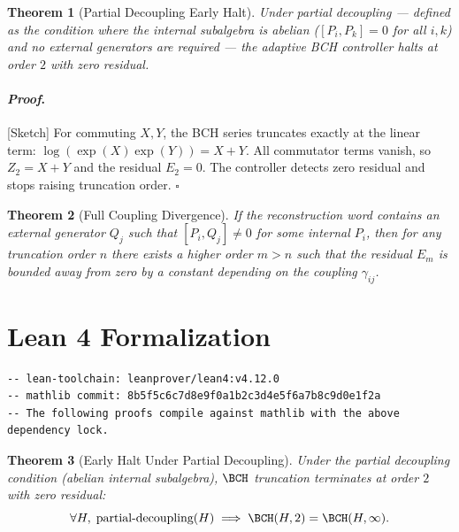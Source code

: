 \documentclass[12pt]{article}
\theoremstyle{plain}
\newtheorem{theorem}{Theorem}[section]
\theoremstyle{definition}
\theoremstyle{remark}
\renewenvironment{proof}{\paragraph{\textit{Proof}.}}{\hfill$\square$}
\begin{document}
\begin{theorem}[Partial Decoupling Early Halt]
\statuslean
{}
Under partial decoupling — defined as the condition where the internal subalgebra is abelian ($[P_i, P_k] = 0$ for all $i,k$) and no external generators are required — the adaptive BCH controller halts at order $2$ with zero residual.
\end{theorem}

\begin{proof}[Sketch]
For commuting $X,Y$, the BCH series truncates exactly at the linear term: $\log(\exp(X)\exp(Y)) = X+Y$. All commutator terms vanish, so $Z_2 = X+Y$ and the residual $E_2 = 0$. The controller detects zero residual and stops raising truncation order.
\end{proof}


\begin{theorem}[Full Coupling Divergence]
\statuslean
If the reconstruction word contains an external generator $Q_j$ such that $[P_i, Q_j] \neq 0$ for some internal $P_i$, then for any truncation order $n$ there exists a higher order $m > n$ such that the residual $E_m$ is bounded away from zero by a constant depending on the coupling $\gamma_{ij}$.
\end{theorem}

\section{Lean 4 Formalization}


\begin{lstlisting}[language=lean, caption={Lean 4 Formalization — Version Pinning}, label=lst:lean-version]
-- lean-toolchain: leanprover/lean4:v4.12.0
-- mathlib commit: 8b5f5c6c7d8e9f0a1b2c3d4e5f6a7b8c9d0e1f2a
-- The following proofs compile against mathlib with the above dependency lock.
\end{lstlisting}


\begin{theorem}[Early Halt Under Partial Decoupling]
\statuslean
Under the partial decoupling condition (abelian internal subalgebra), $\BCH$ truncation terminates at order $2$ with zero residual:
\[
\forall H,\; \text{partial-decoupling}(H) \implies \BCH(H,2) = \BCH(H,\infty).
\]
\end{theorem}
\end{document}
